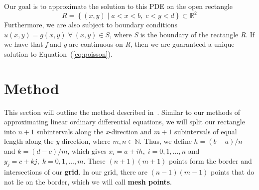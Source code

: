\documentclass[12pt, titlepage]{article}
\begin{document}
    Our goal is to approximate the solution to this PDE on the open rectangle 
    \begin{equation*}
        R = \left\{(x,y)\; |\; a < x < b,\; c < y < d\right\} \subset \mathbb{R}^2
    \end{equation*}
    Furthermore, we are also subject to boundary conditions $u(x,y) = g(x,y)\;\forall\:(x,y)\in S$, where \textit{S} is
    the boundary of the rectangle \textit{R}. If we have that \textit{f} and \textit{g} are continuous on \textit{R}, then 
    we are guaranteed a unique solution to Equation~(\ref{eq:poisson}).
    \section{Method}
    This section will outline the method described in~\cite{burden_faires_2011}. Similar to our methods of approximating linear ordinary differential equations, we will split our rectangle into
    $n+1$ subintervals along the \textit{x}-direction and $m+1$ subintervals of equal length along the \textit{y}-direction, where $m,n \in \mathbb{N}$.
    Thus, we define $h=(b-a)/n$ and $k=(d-c)/m$, which gives $x_i = a  + ih,\; i=0,1,\dots,n$ and $y_j = c + kj, \; k=0,1,\dots,m$. These $(n+1)(m+1)$ points
    form the border and intersections of our \textbf{grid}. In our grid, there are $(n-1)(m-1)$ points that do not lie on the border, which we will call \textbf{mesh points}.
\end{document}
